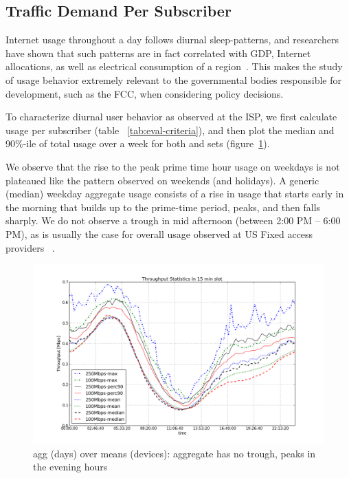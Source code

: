 \subsection{Traffic Demand Per Subscriber}\label{subsec:behavior}

Internet usage throughout a day follows diurnal sleep-patterns, and researchers
have shown that such patterns are in fact correlated with GDP, Internet 
allocations, as well as electrical consumption of 
a region~\cite{ant-diurnal-web}. This makes the study of usage behavior 
extremely relevant to the governmental bodies responsible
for development, such as the FCC, when considering policy decisions.

To characterize diurnal user behavior as observed at the ISP, we first calculate
usage per subscriber (table ~\ref{tab:eval-criteria}), and then plot the median 
and 90\%-ile of total usage over a week for both \treatment{} and \control{}
sets (figure~\ref{fig:TS-data-rate-daily}).


We observe that the rise to the peak prime time hour usage on weekdays
is not plateaued like the pattern observed on weekends (and holidays).
A generic (median) weekday aggregate usage consists of a rise in usage that starts
early in the morning that builds up to the prime-time period, peaks, and then falls sharply.
We do not observe a trough in mid afternoon (between 2:00 PM -- 6:00 PM), as is usually
the case for overall usage observed at US Fixed access providers 
~\cite{sandvine20141h}.

\begin{figure}[ht]
\begin{minipage}{\linewidth}
  \centering
  \includegraphics[width=\linewidth]{figures/describe-total-throughput-per-day[replace].png}
  \caption{agg (days) over means (devices): aggregate has no trough, peaks in the evening hours}
  \label{fig:TS-data-rate-daily}
\end{minipage}
\end{figure}

